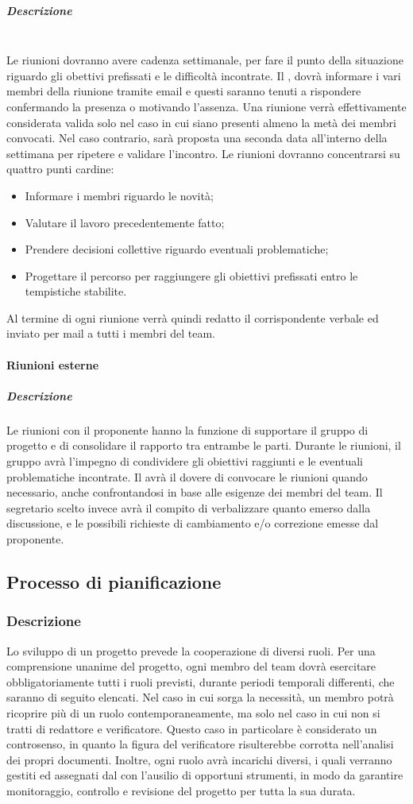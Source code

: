 \subparagraph{Descrizione}
~\\Le riunioni dovranno avere cadenza settimanale, per fare il punto della situazione riguardo gli obettivi prefissati e
le difficoltà incontrate. Il \RdP{}, dovrà informare i vari membri della riunione tramite email e questi saranno tenuti a rispondere confermando la presenza o motivando l'assenza. Una riunione verrà effettivamente considerata
valida solo nel caso in cui siano presenti almeno la metà dei membri convocati. Nel caso contrario, sarà proposta una seconda data all'interno della settimana per ripetere e validare l'incontro.
Le riunioni dovranno concentrarsi su quattro punti cardine:
\begin{itemize}
	\item Informare i membri riguardo le novità;
	\item Valutare il lavoro precedentemente fatto;
	\item Prendere decisioni collettive riguardo eventuali problematiche;
	\item Progettare il percorso per raggiungere gli obiettivi prefissati entro le tempistiche stabilite.
\end{itemize}
Al termine di ogni riunione verrà quindi redatto il corrispondente verbale ed inviato per mail a tutti i membri del team.

\paragraph{Riunioni esterne}
\subparagraph{Descrizione}
Le riunioni con il proponente hanno la funzione di supportare il gruppo di progetto e di consolidare il rapporto tra entrambe le parti. Durante le riunioni, il gruppo avrà l'impegno di condividere gli obiettivi raggiunti e le eventuali problematiche incontrate. 
Il \RdP{} avrà il dovere di convocare le riunioni quando necessario, anche confrontandosi in base alle esigenze dei membri del team. Il segretario scelto invece avrà il compito di verbalizzare quanto emerso dalla discussione, e le possibili richieste di cambiamento e/o correzione emesse dal proponente.

\subsection{Processo di pianificazione}
\subsubsection{Descrizione}
Lo sviluppo di un progetto prevede la cooperazione di diversi ruoli. Per una comprensione unanime del progetto, ogni membro del team dovrà esercitare obbligatoriamente tutti i ruoli previsti, durante periodi temporali differenti, che saranno di seguito elencati. Nel caso in cui sorga la necessità, un membro potrà ricoprire più di un ruolo contemporaneamente, ma solo nel caso in cui non si tratti di redattore e verificatore. Questo caso in particolare è considerato un controsenso, in quanto la figura del verificatore risulterebbe corrotta nell'analisi dei propri documenti. Inoltre, ogni ruolo avrà incarichi diversi, i quali verranno gestiti ed assegnati dal \RdP{} con l'ausilio di opportuni strumenti, in modo da garantire monitoraggio, controllo e revisione del progetto per tutta la sua durata.
